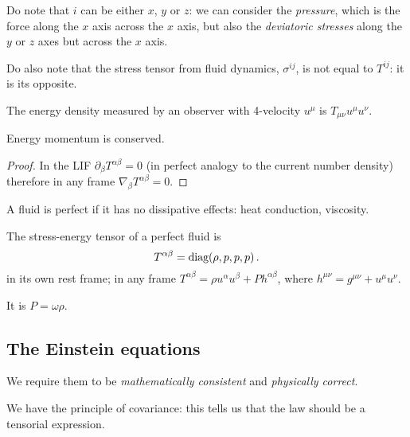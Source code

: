 \documentclass[main.tex]{subfiles}
\begin{document}
Do note that \(i\) can be either \(x\), \(y\) or \(z\): we can consider the \emph{pressure}, which is the force along the \(x\) axis across the \(x\) axis, but also the \emph{deviatoric stresses} along the \(y\) or \(z\) axes but across the \(x\) axis.

Do also note that the stress tensor from fluid dynamics, \(\sigma^{ij}\), is not equal to \(T^{ij}\): it is its opposite.

The energy density measured by an observer with 4-velocity \(u^{\mu }\) is \(T_{\mu \nu } u^{\mu }u^{\nu }\).

\begin{claim}
Energy momentum is conserved.
\end{claim}

\begin{proof}
In the LIF \(\partial_{\beta }T^{\alpha \beta }= 0\) (in perfect analogy to the current number density) therefore in any frame \(\nabla_{\beta }T^{\alpha \beta }= 0\).
\end{proof}


\begin{definition}
A fluid is perfect if it has no dissipative effects: heat conduction, viscosity.
\end{definition}

\begin{claim}
The stress-energy tensor of a perfect fluid is 
%
\begin{equation}
  T^{\alpha \beta } = \text{diag}\qty(\rho , p, p, p )
\,.
\end{equation}
%
in its own rest frame; in any frame \(T^{\alpha \beta } = \rho u^{\alpha } u^{\beta } + P h^{\alpha \beta }\),  where \(h^{\mu \nu } = g^{ \mu \nu }+u^{\mu } u^{\nu }\).
\end{claim}

\begin{definition}
It is \(P = \omega \rho \).
\end{definition}

\subsection{The Einstein equations}

We require them to be \emph{mathematically consistent} and \emph{physically correct}.

We have the principle of covariance: this tells us that the law should be a tensorial expression.
\end{document}
